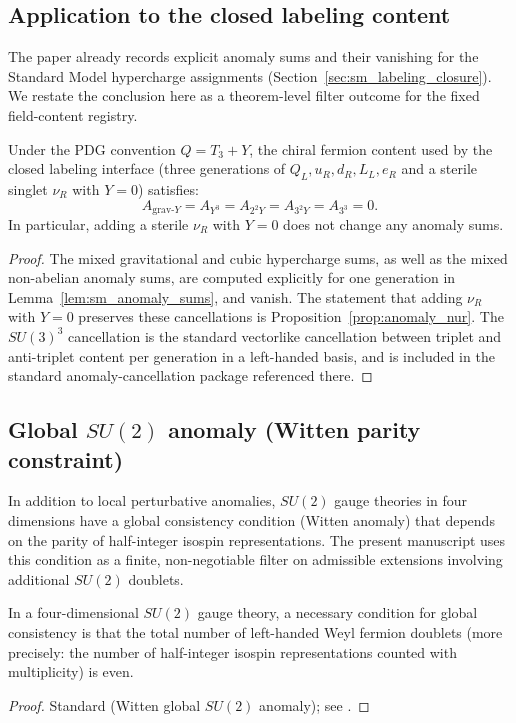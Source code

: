 \subsection{Application to the closed labeling content}

The paper already records explicit anomaly sums and their vanishing for the Standard Model hypercharge assignments (Section~\ref{sec:sm_labeling_closure}).
We restate the conclusion here as a theorem-level filter outcome for the fixed field-content registry.

\begin{theorem}\label{thm:closed_labeling_anomaly_free}
\MathTag Under the PDG convention $Q=T_3+Y$, the chiral fermion content used by the closed labeling interface (three generations of $Q_L,u_R,d_R,L_L,e_R$ and a sterile singlet $\nu_R$ with $Y=0$) satisfies:
\[
A_{\mathrm{grav}\text{-}Y}=A_{Y^3}=A_{2^2Y}=A_{3^2Y}=A_{3^3}=0.
\]
In particular, adding a sterile $\nu_R$ with $Y=0$ does not change any anomaly sums.
\end{theorem}
\begin{proof}
The mixed gravitational and cubic hypercharge sums, as well as the mixed non-abelian anomaly sums, are computed explicitly for one generation in Lemma~\ref{lem:sm_anomaly_sums}, and vanish.
The statement that adding $\nu_R$ with $Y=0$ preserves these cancellations is Proposition~\ref{prop:anomaly_nur}.
The $SU(3)^3$ cancellation is the standard vectorlike cancellation between triplet and anti-triplet content per generation in a left-handed basis, and is included in the standard anomaly-cancellation package referenced there.
\end{proof}

\subsection{Global $SU(2)$ anomaly (Witten parity constraint)}

In addition to local perturbative anomalies, $SU(2)$ gauge theories in four dimensions have a global consistency condition (Witten anomaly) that depends on the parity of half-integer isospin representations.
The present manuscript uses this condition as a finite, non-negotiable filter on admissible extensions involving additional $SU(2)$ doublets.

\begin{proposition}\label{prop:su2_global_anomaly_filter}
\MathTag In a four-dimensional $SU(2)$ gauge theory, a necessary condition for global consistency is that the total number of left-handed Weyl fermion doublets (more precisely: the number of half-integer isospin representations counted with multiplicity) is even.
\end{proposition}
\begin{proof}
Standard (Witten global $SU(2)$ anomaly); see \cite{Witten1982SU2Anomaly}.
\end{proof}

